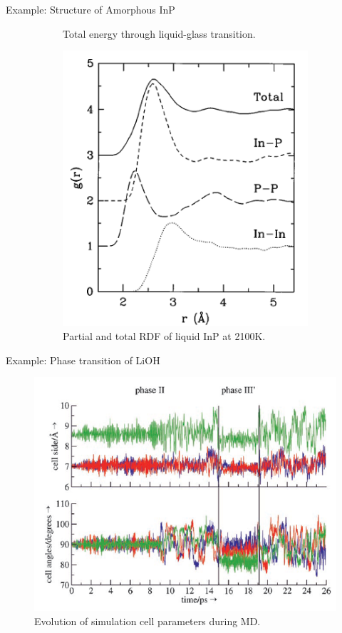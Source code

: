 \documentclass[aspectratio=169]{beamer}
\begin{document}
\begin{frame}{Example: Structure of Amorphous InP}
\begin{figure}
\begin{subfigure}{0.3\textwidth}
                \caption{Total energy through liquid-glass transition.}
            \end{subfigure}
            \begin{subfigure}{0.3\textwidth}
                \centering
                \includegraphics[width=\linewidth]{lectures/figures/13-InP_3.png}
                \caption{Partial and total RDF of liquid InP at 2100K.}
            \end{subfigure}
            \caption{\cite{lewisStructureElectronicProperties1998}}
            \label{fig}
        \end{figure}
    \end{frame}

    \begin{frame}{Example: Phase transition of LiOH}
        \begin{figure}
            \centering
            \includegraphics[width=0.5\linewidth]{lectures/figures/13-LiOH.png}
            \caption{Evolution of simulation cell parameters during MD.\cite{pagliaiLithiumHydroxidePhase2006}}
        \end{figure}
    \end{frame}
\end{document}
